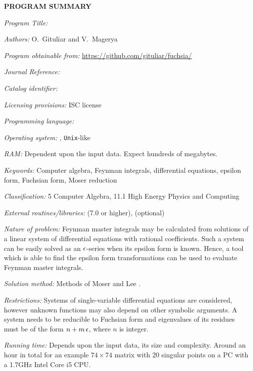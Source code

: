 {\bf PROGRAM SUMMARY}

\begin{small}
\noindent

{\em Program Title:}
    \fuchsia

{\em Authors:}
    O.~Gituliar and V.~Magerya

{\em Program obtainable from:}
    \url{https://github.com/gituliar/fuchsia/}

{\em Journal Reference:}

{\em Catalog identifier:}

{\em Licensing provisions:}
    ISC license

{\em Programming language:}

{\em Operating system:}
    \linux, \texttt{Unix}-like

{\em RAM:}
    Dependent upon the input data. Expect hundreds of megabytes.

{\em Keywords:}
    Computer algebra, Feynman integrals, differential equations, epsilon form, Fuchsian form, Moser reduction

{\em Classification:}
    5 Computer Algebra, 11.1 High Energy Physics and Computing

{\em External routines/libraries:}
    \href{http://www.sagemath.org/}{\sage} (7.0 or higher), \maple (optional)

{\em Nature of problem:}
    Feynman master integrals may be calculated from solutions of a linear system of differential equations with rational coefficients.
    Such a system can be easily solved as an $\epsilon$-series when its epsilon form is known.
    Hence, a tool which is able to find the epsilon form transformations can be used to evaluate Feynman master integrals. 

{\em Solution method:}
    Methods of Moser \cite{Mos59} and Lee \cite{Lee15}.

{\em Restrictions:}
    Systems of single-variable differential equations are considered, however unknown functions may also depend on other symbolic arguments.
    A system needs to be reducible to Fuchsian form and eigenvalues of its residues must be of the form $n + m\,\epsilon$, where $n$ is integer.

{\em Running time:}
    Depends upon the input data, its size and complexity.
    Around an hour in total for an example $74\times74$ matrix with 20 singular points on a PC with a 1.7GHz Intel Core i5 CPU.

\end{small}
